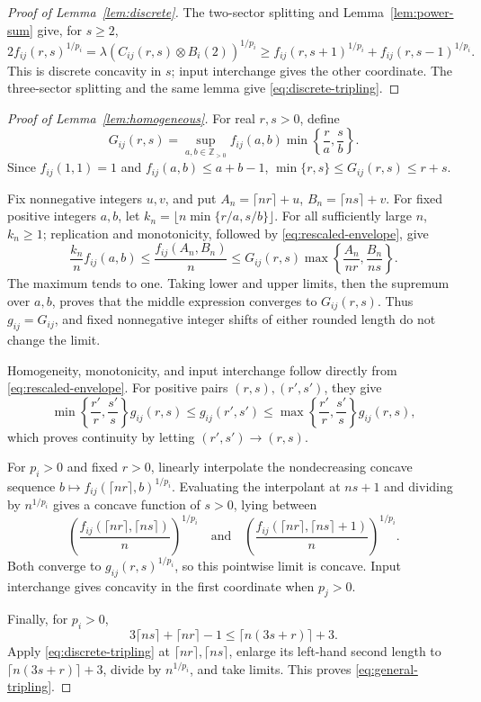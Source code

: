 \documentclass[11pt]{article}
\begin{document}
\begin{proof}[Proof of Lemma~\ref{lem:discrete}]
The two-sector splitting and Lemma~\ref{lem:power-sum} give, for $s\ge2$,
\[
 2f_{ij}(r,s)^{1/p_i}
 =\lambda(C_{ij}(r,s)\otimes B_i(2))^{1/p_i}
 \ge f_{ij}(r,s+1)^{1/p_i}+f_{ij}(r,s-1)^{1/p_i}.
\]
This is discrete concavity in $s$; input interchange gives the other
coordinate. The three-sector splitting and the same lemma give
\eqref{eq:discrete-tripling}.
\end{proof}

\begin{proof}[Proof of Lemma~\ref{lem:homogeneous}]
For real $r,s>0$, define
\begin{equation}\label{eq:rescaled-envelope}
 G_{ij}(r,s)=\sup_{a,b\in\mathbb Z_{>0}}
 f_{ij}(a,b)\min\left\{\frac ra,\frac sb\right\}.
\end{equation}
Since $f_{ij}(1,1)=1$ and $f_{ij}(a,b)\le a+b-1$,
$\min\{r,s\}\le G_{ij}(r,s)\le r+s$.

Fix nonnegative integers $u,v$, and put
$A_n=\lceil nr\rceil+u$, $B_n=\lceil ns\rceil+v$.
For fixed positive integers $a,b$, let
$k_n=\lfloor n\min\{r/a,s/b\}\rfloor$.
For all sufficiently large $n$, $k_n\ge1$; replication and monotonicity,
followed by \eqref{eq:rescaled-envelope}, give
\[
 \frac{k_n}{n}f_{ij}(a,b)
 \le\frac{f_{ij}(A_n,B_n)}n
 \le G_{ij}(r,s)
       \max\left\{\frac{A_n}{nr},\frac{B_n}{ns}\right\}.
\]
The maximum tends to one. Taking lower and upper limits, then the
supremum over $a,b$, proves that the middle expression converges to
$G_{ij}(r,s)$. Thus $g_{ij}=G_{ij}$, and fixed nonnegative integer shifts
of either rounded length do not change the limit.

Homogeneity, monotonicity, and input interchange follow directly from
\eqref{eq:rescaled-envelope}. For positive pairs $(r,s),(r',s')$, they give
\begin{equation}\label{eq:profile-continuity}
 \min\left\{\frac{r'}r,\frac{s'}s\right\}g_{ij}(r,s)
 \le g_{ij}(r',s')
 \le\max\left\{\frac{r'}r,\frac{s'}s\right\}g_{ij}(r,s),
\end{equation}
which proves continuity by letting $(r',s')\to(r,s)$.

For $p_i>0$ and fixed $r>0$, linearly interpolate the nondecreasing
concave sequence $b\mapsto f_{ij}(\lceil nr\rceil,b)^{1/p_i}$.
Evaluating the interpolant at $ns+1$ and dividing by $n^{1/p_i}$ gives
a concave function of $s>0$, lying between
\[
 \left(\frac{f_{ij}(\lceil nr\rceil,\lceil ns\rceil)}n\right)^{1/p_i}
 \quad\text{and}\quad
 \left(\frac{f_{ij}(\lceil nr\rceil,\lceil ns\rceil+1)}n\right)^{1/p_i}.
\]
Both converge to $g_{ij}(r,s)^{1/p_i}$, so this pointwise limit is
concave. Input interchange gives concavity in the first coordinate
when $p_j>0$.

Finally, for $p_i>0$,
\[
 3\lceil ns\rceil+\lceil nr\rceil-1
 \le\lceil n(3s+r)\rceil+3.
\]
Apply \eqref{eq:discrete-tripling} at $\lceil nr\rceil,\lceil ns\rceil$,
enlarge its left-hand second length to $\lceil n(3s+r)\rceil+3$,
divide by $n^{1/p_i}$, and take limits. This proves
\eqref{eq:general-tripling}.
\end{proof}
\end{document}
